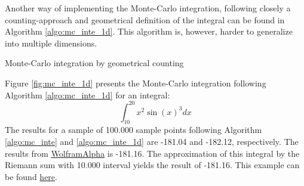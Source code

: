 Another way of implementing the Monte-Carlo integration, following closely a counting-approach and geometrical definition of the integral can be found in Algorithm \ref{algo:mc_inte_1d}. This algorithm is, however, harder to generalize into multiple dimensions. 

\vspace{\baselineskip}
\begin{algorithm}[H]
\caption{Monte-Carlo integration by geometrical counting}
\label{algo:mc_inte_1d}  
\end{algorithm}
\vspace{\baselineskip}

Figure \ref{fig:mc_inte_1d} presents the Monte-Carlo integration following Algorithm \ref{algo:mc_inte_1d} for an integral:
\begin{equation}
	\int_{10}^{20} x^2 \sin(x)^3 dx
\end{equation}
The results for a sample of 100.000 sample points following Algorithm \ref{algo:mc_inte} and \ref{algo:mc_inte_1d} are -181.04 and -182.12, respectively. The results from \href{https://www.wolframalpha.com/input/?i=integrate+x^2+sin^3+x+dx+from+10+to+20}{WolframAlpha} is -181.16. The approximation of this integral by the Riemann sum with 10.000 interval yields the result of -181.16. This example can be found \href{https://github.com/chitn/quantfin_study/blob/master/code/integration.py}{here}.

